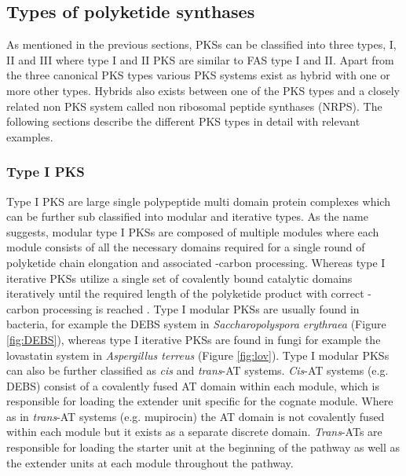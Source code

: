  			 	
		\subsection{Types of polyketide synthases}
		\label{sec:PKStypes}
		As mentioned in the previous sections, PKSs can be classified into three types, I, II and III where type I and II PKS are similar to FAS type I and II. Apart from the three canonical PKS types various PKS systems exist as hybrid with one or more other types. Hybrids also exists between one of the PKS types and a closely related non PKS system called non ribosomal peptide synthases (NRPS). The following sections describe the different PKS types in detail with relevant examples. 
			
			\subsubsection{Type I PKS}
			\label{sec:typeIPKS}
			Type I PKS are large single polypeptide multi domain protein complexes which can be further sub classified into modular and iterative types. As the name suggests, modular type I PKSs are composed of multiple modules where each module consists of all the necessary domains required for a single round of polyketide chain elongation and associated \bet-carbon processing. Whereas type I  iterative PKSs utilize a single set of covalently bound catalytic domains iteratively until the required length of the polyketide product with correct \bet-carbon processing is reached \parencite{Hertweck2009}. Type I modular PKSs are usually found in bacteria, for example the DEBS system in \textit{Saccharopolyspora erythraea} (Figure \ref{fig:DEBS}), whereas type I iterative PKSs are found in fungi for example the lovastatin system in \textit{Aspergillus terreus} (Figure \ref{fig:lov}). Type I modular PKSs can also be further classified as \textit{cis} and \textit{trans}-AT systems. \textit{Cis}-AT systems (e.g. DEBS) consist of a covalently fused AT domain within each module, which is responsible for loading the extender unit specific for the cognate module. Where as in \textit{trans}-AT systems (e.g. mupirocin) the AT domain is not covalently fused within each module but it exists as a separate discrete domain. \textit{Trans}-ATs are responsible for loading the starter unit at the beginning of the pathway as well as the extender units at each module throughout the pathway. 
			

